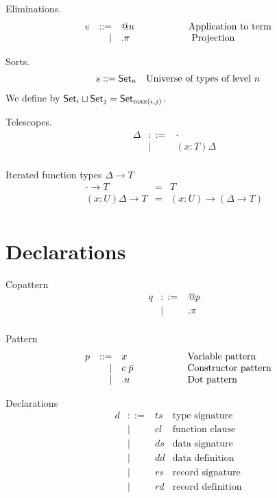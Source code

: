 \documentclass[acmlarge]{acmart}\settopmatter{}
\renewcommand{\|}{\mid}
\begin{document}
Eliminations.
\[\begin{array}{lrl@{\hspace{2cm}}l}
e &::=& @u                & \text{Application to term} \\
    &|& .\pi               & \text{ Projection} \\
\end{array} \]

Sorts.
\[\begin{array}{lrl@{\hspace{2cm}}l}
s ::= \Set_n             &  \text{Universe of types of level $n$} \\
\end{array} \]
We define  by $\mathsf{Set}_i \sqcup \mathsf{Set}_j = \mathsf{Set}_{\max(i,j)}$.

Telescopes.
\[\begin{array}{lrll}
\Delta &::=& ·  & \\
      &  |& (x : T)\Delta & \\
\end{array} \]

Iterated function types $\Delta \rightarrow T$
\[\begin{array}{lrll}
· \rightarrow T &=& T &\\
(x : U)\Delta \rightarrow T &=& (x : U) \rightarrow (\Delta \rightarrow T) & \\
\end{array} \]


\section{Declarations}
\label{sec:declarations}

Copattern
\[\begin{array}{lrll}
q &::=& @p &\\
  &  |& .\pi \\
\end{array} \]

Pattern
\[\begin{array}{lrl@{\hspace{2cm}}l}
p &::=& x     &   \text{Variable pattern} \\
    &|& c\; \bar{p}    &   \text{Constructor pattern} \\
    &|& .u      &   \text{Dot pattern} \\
\end{array} \]

Declarations
\[
\begin{array}{lrll}
d  & ::=  & \mathit{ts} & \mbox{type signature}
\\ & \mid & \mathit{cl} & \mbox{function clause}
\\ & \mid & \mathit{ds} & \mbox{data signature}
\\ & \mid & \mathit{dd} & \mbox{data definition}
\\ & \mid & \mathit{rs} & \mbox{record signature}
\\ & \mid & \mathit{rd} & \mbox{record definition}

\end{array}
 \]
\end{document}
